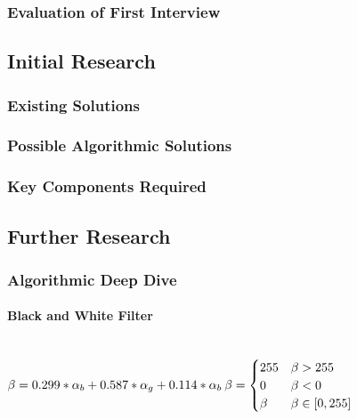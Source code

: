 \begin{flushleft}
            \subsubsection{Evaluation of First Interview}

        \bk

        \subsection{Initial Research} 
            \subsubsection{Existing Solutions}

            \subsubsection{Possible Algorithmic Solutions}

            \subsubsection{Key Components Required}

        \subsection{Further Research}
            \subsubsection{Algorithmic Deep Dive}

            \paragraph{Black and White Filter}
            \mbox{} \\
            
            \bk
            \begin{math}
                {\beta = 0.299 * \alpha_{b} + 0.587 * \alpha_{g} + 0.114 * \alpha_{b}} \\

                \:
                
                \beta = \begin{cases}
                    255 & \beta > 255 \\
                    0 & \beta < 0 \\
                    \beta & \beta \in [0, 255]
                \end{cases}
            

\end{math}
\end{flushleft}
